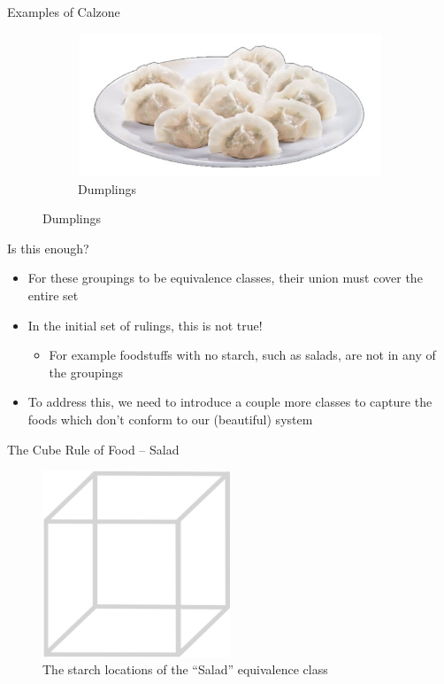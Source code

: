 \documentclass{beamer}
\begin{document}
\begin{frame}{Examples of Calzone}
\begin{figure}
\begin{subfigure}{.4\textwidth}
        \end{subfigure}%
        \begin{subfigure}{.4\textwidth}
          \centering
          \includegraphics[width=.8\linewidth]{calzone/28_dumplings.jpg}
          \caption{\label{fig:dumplings}Dumplings}
        \end{subfigure}
    \end{figure}
\end{frame}

\begin{frame}{Is this enough?}
    \begin{itemize}
        \item For these groupings to be equivalence classes, their union must cover the entire set
        \item In the initial set of rulings, this is not true!
        \begin{itemize}
            \item For example foodstuffs with no starch, such as salads, are not in any of the groupings
        \end{itemize}
        \item To address this, we need to introduce a couple more classes to capture the foods which don't conform to our (beautiful) system
    \end{itemize}
\end{frame}

\begin{frame}{The Cube Rule of Food -- Salad}
    \begin{figure}
        \includegraphics[width=0.5\textwidth]{salad/29_salad.jpg}
        \caption{\label{fig:salad-diagram}The starch locations of the ``Salad'' equivalence class}
    \end{figure}
\end{frame}
\end{document}
